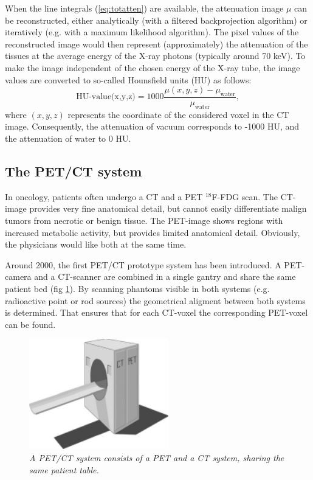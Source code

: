 \documentclass[11pt,oneside]{book}
\begin{document}
When the line integrals (\ref{eq:totatten}) are available, the
attenuation image $\mu$ can be reconstructed, either analytically
(with a filtered backprojection algorithm) or iteratively (e.g. with a
maximum likelihood algorithm). The pixel values of the reconstructed
image would then represent (approximately) the attenuation of the
tissues at the average energy of the X-ray photons (typically around
70 keV). To make the image independent of the chosen energy of the
X-ray tube, the image values are converted to so-called Hounsfield
units (HU) as follows:
\begin{equation}
  \mbox{HU-value(x,y,z)} 
    = 1000 \frac{\mu(x,y,z) - \mu_{\mbox{water}}}{\mu_{\mbox{water}}},
\end{equation}
where $(x,y,z)$ represents the coordinate of the considered voxel in
the CT image.  Consequently, the attenuation of vacuum corresponds to
-1000 HU, and the attenuation of water to 0 HU.

\subsection{The PET/CT system}
In oncology, patients often undergo a CT and a PET $^{18}$F-FDG scan. The
CT-image provides very fine anatomical detail, but cannot easily differentiate
malign tumors from necrotic or benign tissue. The PET-image shows regions with
increased metabolic activity, but provides limited anatomical detail.
Obviously, the physicians would like both at the same time.

Around 2000, the first PET/CT prototype system has been introduced. A
PET-camera and a CT-scanner are combined in a single gantry and share
the same patient bed (fig \ref{fig:petct}). By scanning phantoms
visible in both systems (e.g. radioactive point or rod sources) the
geometrical aligment between both systems is determined. That ensures
that for each CT-voxel the corresponding PET-voxel can be found.
%
\begin{figure}[tbp]
\centering
\includegraphics[width=0.54\textwidth]{figs/fig_petct.pdf}
\caption{\label{fig:petct} \emph{A PET/CT system consists of a PET and
 a CT system, sharing the same patient table.}}
\end{figure}
\end{document}
